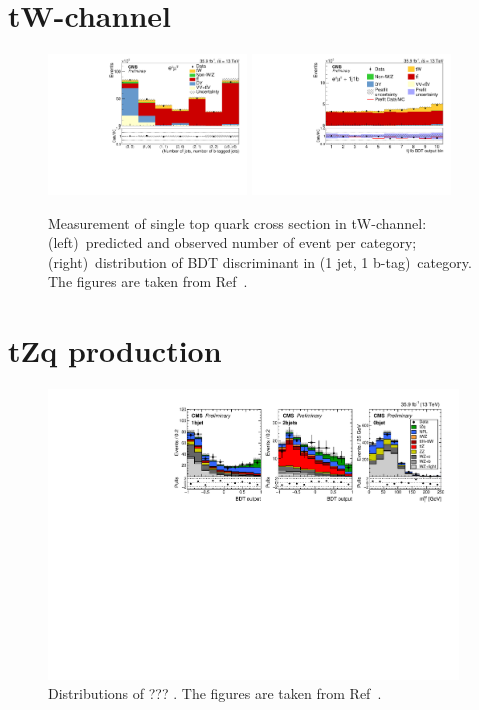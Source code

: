 \documentclass[12pt]{article}
\begin{document}
\section{tW-channel}

\begin{figure}[!htb]
\begin{center}
\includegraphics[width=0.47\textwidth]{tW-categories.pdf}\hspace{0.02\textwidth}
\includegraphics[width=0.47\textwidth]{tW-bdt.pdf}
\caption{Measurement of single top quark cross section in tW-channel: (left)~predicted and observed number of event per category; (right)~distribution of BDT discriminant in (1 jet, 1 b-tag)~category. The figures are taken from Ref~\cite{tw-inc}.}
\end{center}
\end{figure}

\section{tZq production}

\begin{figure}[!htb]
\begin{center}
\includegraphics[width=0.97\textwidth]{tZq-fit.pdf}
\caption{Distributions of ??? . The figures are taken from Ref~\cite{tZq-inc}.}
\end{center}
\end{figure}
\end{document}
